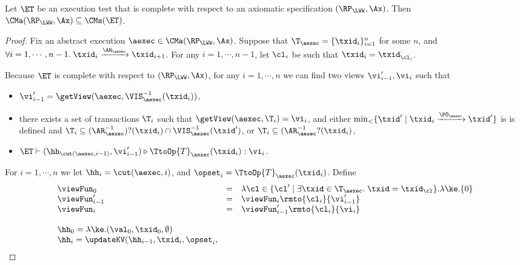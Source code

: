 \begin{theorem}
\label{thm:et_complete}
Let $\ET$ be an execution test that is complete with respect to 
an axiomatic specification $(\RP_{\LWW}, \Ax)$. Then 
$\CMa(\RP_{\LWW}, \Ax) \subseteq \CMs(\ET)$.
\end{theorem}
\begin{proof}
Fix an abstract execution $\aexec \in \CMa(\RP_{\LWW}, \Ax)$. 
Suppose that $\T_{\aexec} = \{\txid_{i}\}_{i=1}^{n}$ for some $n$, and 
$\forall i=1,\cdots,n-1.\;\txid_{i} \xrightarrow{\AR_{\aexec}} \txid_{i+1}$.
For any $i=1,\cdots,n-1$, let $\cl_{i}$ be such that $\txid_{i} = \txid_{\cl_{i}}^{\cdot}$.

Because $\ET$ is complete with respect to $(\RP_{\LWW}, \Ax)$, 
for any $i=1,\cdots,n$ we can find two views $\vi'_{i-1}, \vi_{i}$ such that 
\begin{itemize}
\item $\vi'_{i-1} = \getView(\aexec, \VIS^{-1}_{\aexec}(\txid_{i}))$, 
\item there exists a set of transactions $\T_{i}$ such that $\getView(\aexec, \T_{i}) = \vi_{i}$, and 
either $\min_{<}\{\txid' \mid \txid_{i} \xrightarrow{\PO_{\aexec}} \txid'\}$ is 
is defined and $\T_{i} \subseteq (\AR_{\aexec}^{-1})?(\txid_{i}) \cap \VIS^{-1}_{\aexec}(\txid')$, 
or $\T_{i} \subseteq (\AR_{\aexec}^{-1}?(\txid_{i})$, 
\item $\ET \vdash (\hh_{\cut(\aexec, i-1)}, \vi'_{i-1}) \triangleright \TtoOp{T}_{\aexec}(\txid_{i}): \vi_{i}$.
\end{itemize}

For $i=1,\cdots,n$ we let $\hh_{i} = \cut(\aexec, i)$, and $\opset_{i} = \TtoOp{T}_{\aexec}(\txid_{i})$. Define 
\[
\begin{array}{lcl}
\viewFun_{0} &=& \lambda \cl \in \{\cl' \mid \exists \txid \in \T_{\aexec}.\; \txid = \txid_{\cl}\}. \lambda \ke. \{0\}\\
\viewFun'_{i-1} &=& \viewFun_{i}\rmto{\cl_{i}}{ \vi'_{i-1}}\\
\viewFun_{i} &=& \viewFun'_{i-1}\rmto{\cl_{i} }{\vi_{i}}\\
&&\\
\hh_{0} = \lambda \ke.(\val_{0}, \txid_{0}, \emptyset)\\
\hh_{i} = \updateKV(\hh_{i-1}, \txid_{i}, \opset_{i}, 
\end{array}
\]


\end{proof}
